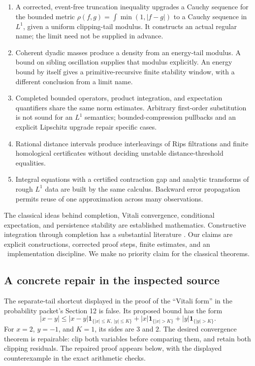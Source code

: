 \begin{enumerate}
\item A corrected, event-free truncation inequality upgrades a Cauchy
sequence for the bounded metric
\(\rho(f,g)=\int\min(1,|f-g|)\) to a Cauchy sequence in \(L^1\), given a
uniform clipping-tail modulus. It constructs an actual regular name;
the limit need not be supplied in advance.
\item Coherent dyadic masses produce a density from an energy-tail
modulus. A bound on sibling oscillation supplies that modulus explicitly.
An energy bound by itself gives a primitive-recursive finite stability
window, with a different conclusion from a limit name.
\item Completed bounded operators, product integration, and expectation
quantifiers share the same norm estimates. Arbitrary first-order
substitution is not sound for an \(L^1\) semantics; bounded-compression
pullbacks and an explicit Lipschitz upgrade repair specific cases.
\item Rational distance intervals produce interleavings of Rips
filtrations and finite homological certificates without deciding unstable
distance-threshold equalities.
\item Integral equations with a certified contraction gap and analytic
transforms of rough \(L^1\) data are built by the same calculus. Backward
error propagation permits reuse of one approximation across many
observations.
\end{enumerate}

The classical ideas behind completion, Vitali convergence, conditional
expectation, and persistence stability are established mathematics.
Constructive integration through completion has a substantial literature
\cite{bishopcheng,petrakiszeuner}. Our claims are explicit constructions,
corrected proof steps, finite estimates, and an \ipra\ implementation
discipline. We make no priority claim for the classical theorems.

\subsection{A concrete repair in the inspected source}

The separate-tail shortcut displayed in the proof of the ``Vitali form''
in the probability packet's Section 12 is false. Its proposed bound has
the form
\[
 |x-y|\leq |x-y|\mathbf1_{\{|x|\leq K,\ |y|\leq K\}}
       +|x|\mathbf1_{\{|x|>K\}}+|y|\mathbf1_{\{|y|>K\}}.
\]
For \(x=2\), \(y=-1\), and \(K=1\), its sides are \(3\) and \(2\).
The desired convergence theorem is repairable: clip both variables
before comparing them, and retain both clipping residuals. The repaired
proof appears below, with the displayed counterexample in the exact
arithmetic checks.

